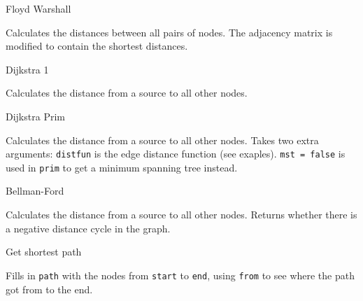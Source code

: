 \begin{algorithm}{Floyd Warshall}

Calculates the distances between all pairs of nodes.
The adjacency matrix is modified to contain the shortest distances.
\end{algorithm}

\begin{algorithm}{Dijkstra 1}

Calculates the distance from a source to all other nodes.
\end{algorithm}

\begin{algorithm}{Dijkstra Prim}

Calculates the distance from a source to all other nodes.
Takes two extra arguments:
{\tt distfun} is the edge distance function (see exaples).
{\tt mst = false} is used in {\tt prim} to get a
minimum spanning tree instead.
\end{algorithm}

\begin{algorithm}{Bellman-Ford}

Calculates the distance from a source to all other nodes.
Returns whether there is a negative distance cycle in the graph.
\end{algorithm}

\begin{algorithm}{Get shortest path}

Fills in {\tt path} with the nodes from {\tt start} to {\tt end}, using
{\tt from} to see where the path got from to the end.
\end{algorithm}
